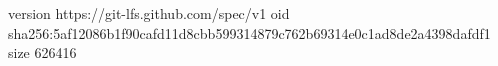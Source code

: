 version https://git-lfs.github.com/spec/v1
oid sha256:5af12086b1f90cafd11d8cbb599314879c762b69314e0c1ad8de2a4398dafdf1
size 626416
